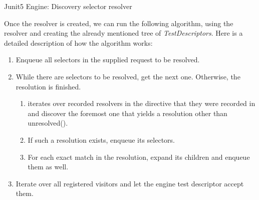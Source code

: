 \begin{algorithm}[H]
    \label{02:alg:selectorresolver}
    \caption{Junit5 Engine: Discovery selector resolver}
    \begin{algorithmic}[1]
        \EndProcedure
    \end{algorithmic}
\end{algorithm}

Once the resolver is created, we can run the following algorithm, using the resolver and creating the already mentioned tree of \emph{TestDescriptors}.
Here is a detailed description of how the algorithm works:

\begin{enumerate}[itemsep=1mm, parsep=0pt]
    \item Enqueue all selectors in the supplied request to be resolved.
    \item While there are selectors to be resolved, get the next one.
    Otherwise, the resolution is finished.
    \begin{enumerate}
        \item iterates over recorded resolvers in the directive that they were recorded in and discover the foremost one that yields a resolution other than unresolved().
        \item If such a resolution exists, enqueue its selectors.
        \item For each exact match in the resolution, expand its children and enqueue them as well.
    \end{enumerate}
    \item Iterate over all registered visitors and let the engine test descriptor accept them.
\end{enumerate}

